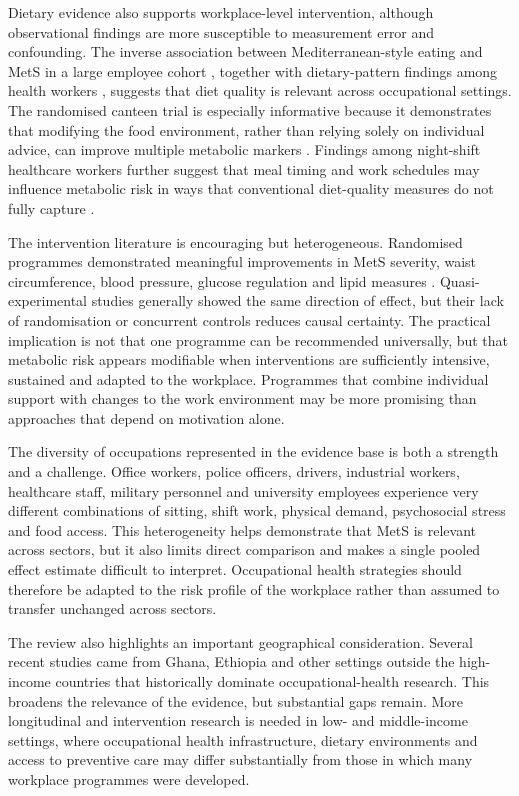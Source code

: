 \documentclass[11pt]{article}
\begin{document}
Dietary evidence also supports workplace-level intervention, although observational findings are more susceptible to measurement error and confounding. The inverse association between Mediterranean-style eating and MetS in a large employee cohort \citep{ReinosoBarbero2026}, together with dietary-pattern findings among health workers \citep{Sharifi2025}, suggests that diet quality is relevant across occupational settings. The randomised canteen trial is especially informative because it demonstrates that modifying the food environment, rather than relying solely on individual advice, can improve multiple metabolic markers \citep{Ma2025}. Findings among night-shift healthcare workers further suggest that meal timing and work schedules may influence metabolic risk in ways that conventional diet-quality measures do not fully capture \citep{dosReis2026}.

The intervention literature is encouraging but heterogeneous. Randomised programmes demonstrated meaningful improvements in MetS severity, waist circumference, blood pressure, glucose regulation and lipid measures \citep{Haufe2019,Ma2025,Bogale2025}. Quasi-experimental studies generally showed the same direction of effect, but their lack of randomisation or concurrent controls reduces causal certainty. The practical implication is not that one programme can be recommended universally, but that metabolic risk appears modifiable when interventions are sufficiently intensive, sustained and adapted to the workplace. Programmes that combine individual support with changes to the work environment may be more promising than approaches that depend on motivation alone.

The diversity of occupations represented in the evidence base is both a strength and a challenge. Office workers, police officers, drivers, industrial workers, healthcare staff, military personnel and university employees experience very different combinations of sitting, shift work, physical demand, psychosocial stress and food access. This heterogeneity helps demonstrate that MetS is relevant across sectors, but it also limits direct comparison and makes a single pooled effect estimate difficult to interpret. Occupational health strategies should therefore be adapted to the risk profile of the workplace rather than assumed to transfer unchanged across sectors.

The review also highlights an important geographical consideration. Several recent studies came from Ghana, Ethiopia and other settings outside the high-income countries that historically dominate occupational-health research. This broadens the relevance of the evidence, but substantial gaps remain. More longitudinal and intervention research is needed in low- and middle-income settings, where occupational health infrastructure, dietary environments and access to preventive care may differ substantially from those in which many workplace programmes were developed.
\end{document}
